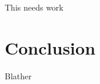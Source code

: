 \documentclass{acm_proc_article-sp}
\begin{document}
    This needs work

\section{Conclusion}

	Blather

%


\begin{thebibliography}{1}


\end{thebibliography}


\balancecolumns
\end{document}
